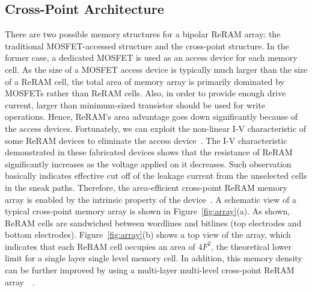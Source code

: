 \subsection{Cross-Point Architecture}
There are two possible memory structures for a bipolar ReRAM array:
the traditional MOSFET-accessed structure and the
cross-point structure. In the former case, a dedicated MOSFET is
used as an access device for each memory cell. As the size of a MOSFET
access device is typically much larger than the size of a ReRAM cell, the
total area of memory array is primarily dominated by MOSFETs rather than
ReRAM cells. Also, in order to provide enough drive current, larger than
minimum-sized transistor should be used for write operations. Hence,
ReRAM's area advantage goes down significantly because of the access devices.
Fortunately, we can exploit the non-linear I-V characteristic of some
ReRAM devices to eliminate the access device~\cite{memristor:switch,memristor:Unity}.
The I-V characteristic
demonstrated in these fabricated devices shows that the resistance of
ReRAM significantly increases as the voltage applied on it decreases. Such
observation basically indicates effective cut off of the leakage current
from the unselected cells in the sneak paths. Therefore, the
area-efficient cross-point ReRAM memory array is enabled by the intrinsic
property of the device~\cite{memristor:Cong}. A schematic view of a
typical cross-point memory array is shown in Figure~\ref{fig:array}(a). As
shown, ReRAM cells are sandwiched between wordlines and bitlines (top
electrodes and bottom electrodes). Figure~\ref{fig:array}(b) shows a top
view of the array, which indicates that each ReRAM cell occupies an area
of $4F^2$, the theoretical lower limit for a single layer single level
memory cell. In addition, this memory density can be further improved by
using a multi-layer multi-level cross-point ReRAM
array~\cite{crossbar_unity}~\cite{memristor:IEDM08_3D}.

